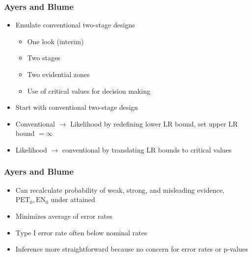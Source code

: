 \documentclass{beamer}\usepackage[]{graphicx}\usepackage[]{color}
\begin{document}
\begin{frame}
\frametitle{Ayers and Blume}
    \begin{itemize}
        \item Emulate conventional two-stage designs
          \begin{itemize}
            \item One look (interim)
            \item Two stages
            \item Two evidential zones
            \item Use of critical values for decision making
          \end{itemize}%
        \item Start with conventional two-stage design
        \item Conventional $\rightarrow$ Likelihood by redefining lower LR bound, set upper LR bound $= \infty$
        \item Likelihood $\rightarrow$ conventional by translating LR bounds to critical values
    \end{itemize}
\end{frame}

\begin{frame}
\frametitle{Ayers and Blume}
    \begin{itemize}
        \item Can recalculate probability of weak, strong, and misleading evidence, $\mbox{PET}_0, \mbox{EN}_0$  under attained
        \item Minimizes average of error rates
        \item Type I error rate often below nominal rates %
        \item Inference more straightforward because no concern for error rates or p-values
    \end{itemize}
\end{frame}
\end{document}
